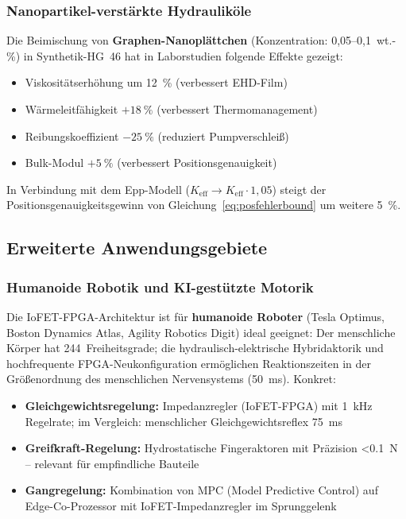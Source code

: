 ﻿\documentclass[a4paper,12pt]{scrreprt}
\theoremstyle{definition}
\begin{document}
\subsubsection{Nanopartikel-verstärkte Hydrauliköle}

Die Beimischung von \textbf{Graphen-Nanoplättchen}
(Konzentration: 0{,}05--0{,}1~wt.-\%) in Synthetik-HG~46
hat in Laborstudien folgende Effekte gezeigt:
\begin{itemize}
  \item Viskositätserhöhung um \SI{12}{\percent} (verbessert EHD-Film)
  \item Wärmeleitfähigkeit $+\SI{18}{\percent}$ (verbessert Thermomanagement)
  \item Reibungskoeffizient $-\SI{25}{\percent}$ (reduziert Pumpverschleiß)
  \item Bulk-Modul $+\SI{5}{\percent}$ (verbessert Positionsgenauigkeit)
\end{itemize}
In Verbindung mit dem Epp-Modell ($K_{\text{eff}} \to K_{\text{eff}} \cdot 1{,}05$)
steigt der Positionsgenauigkeitsgewinn von Gleichung~\eqref{eq:posfehlerbound}
um weitere \SI{5}{\percent}.

\subsection{Erweiterte Anwendungsgebiete}

\subsubsection{Humanoide Robotik und KI-gestützte Motorik}

Die IoFET-FPGA-Architektur ist für \textbf{humanoide Roboter}
(Tesla Optimus, Boston Dynamics Atlas, Agility Robotics Digit)
ideal geeignet: Der menschliche Körper hat 244~Freiheitsgrade;
die hydraulisch-elektrische Hybridaktorik und hochfrequente
FPGA-Neukonfiguration ermöglichen Reaktionszeiten in
der Größenordnung des menschlichen Nervensystems (\SI{50}{\milli\second}).
Konkret:
\begin{itemize}
  \item \textbf{Gleichgewichtsregelung:} Impedanzregler (IoFET-FPGA)
        mit \SI{1}{\kilo\hertz} Regelrate; im Vergleich: menschlicher
        Gleichgewichtsreflex \SI{75}{\milli\second}
  \item \textbf{Greifkraft-Regelung:} Hydrostatische Fingeraktoren
        mit Präzision \SI{<0.1}{\newton} -- relevant für empfindliche
        Bauteile
  \item \textbf{Gangregelung:} Kombination von MPC (Model Predictive
        Control) auf Edge-Co-Prozessor mit IoFET-Impedanzregler
        im Sprunggelenk
\end{itemize}
\end{document}
